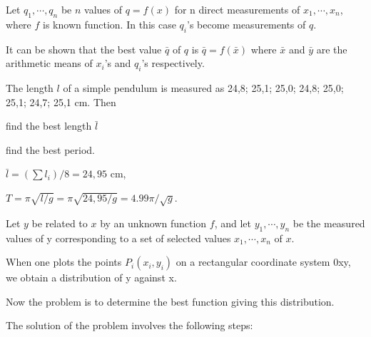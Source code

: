 \documentclass[11pt]{amsbook}
\begin{document}

\begin{hEnumerateArabic}
	
	\item
	Let $q_{1}, \cdots , q_{n}$ be $n$ values of $q=f(x)$ for n direct measurements of $x_{1}, \cdots , x_{n}$, where $f$ is known function. In this case $q_{i}$'s become  measurements of $q$.
	
	It can be shown that the best value $\bar q$ of $q$ is $\bar q = f(\bar x)$ where $\bar x$ and $\bar y$ are the arithmetic means of $x_{i}$'s and $q_{i}$'s respectively.
	\begin{exmp}
		The length $l$ of a simple pendulum is measured as 24,8; 25,1; 25,0; 24,8; 25,0; 25,1; 24,7; 25,1 cm. Then
		\begin{hEnumerateAlpha}
		
			\item
			find the best length $\bar l$
			
			\item
			find the best period.
		\end{hEnumerateAlpha}
		
		\begin{hSolution}
			\begin{hEnumerateAlpha}
			
				\item
				$\bar l = ( \sum l_{i})/8 = 24,95$ cm,
				
				\item
				$ T = \pi \sqrt{l / g} = \pi \sqrt{24,95/g} = 4.99\pi / \sqrt{g}$.
			\end{hEnumerateAlpha}
		\end{hSolution}
	\end{exmp}
	
	\item
	Let $y$ be related  to $x$ by an unknown function $f$, and let $y_{1}, \cdots , y_{n}$ be the measured values of y corresponding to a set of selected values $x_{1}, \cdots , x_{n}$ of $x$.
	
	\begin{multicols}{2}
		When one plots the points $P_{i} ( x_{i}, y_{i})$ on a rectangular coordinate system 0xy, we obtain a distribution of y against x.

		Now the problem is to determine the best function giving this distribution.
	
		The solution of the problem involves the following steps:
		

\end{multicols}
\end{hEnumerateArabic}
\end{document}
